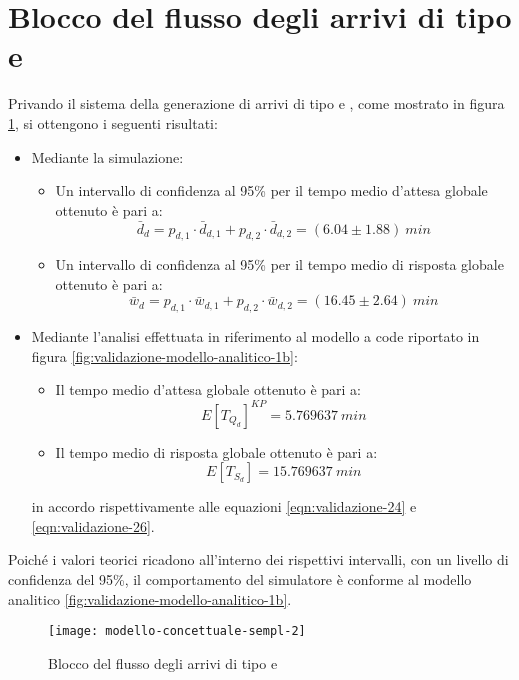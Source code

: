 \section{Blocco del flusso degli arrivi di tipo \uo{} e \pp{}}\label{sec:validazione-blocco-uo-pp}
Privando il sistema della generazione di arrivi di tipo \uo{} e \pp{}, come mostrato in figura \ref{fig:validazione-semplificazione-2}, si ottengono i seguenti risultati:
\begin{itemize}
\item Mediante la simulazione:
\begin{itemize}
\item Un intervallo di confidenza al 95\% per il tempo medio d'attesa globale ottenuto è pari a:
\begin{equation} 
\bar{d}_d = p_{d,1}\cdot \bar{d}_{d,1} + p_{d,2}\cdot \bar{d}_{d,2} = (6.04 \pm 1.88)\ min
\end{equation}
\item Un intervallo di confidenza al 95\% per il tempo medio di risposta globale ottenuto è pari a:
\begin{equation}
\bar{w}_d = p_{d,1}\cdot \bar{w}_{d,1} + p_{d,2}\cdot \bar{w}_{d,2} = (16.45 \pm 2.64)\ min
\end{equation}
\end{itemize}

\item Mediante l'analisi effettuata in riferimento al modello a code riportato in figura \ref{fig:validazione-modello-analitico-1b}:
\begin{itemize}
\item Il tempo medio d'attesa globale ottenuto è pari a:
\begin{equation}
E[T_{Q_d}]^{KP} = 5.769637\ min 
\end{equation}
\item Il tempo medio di risposta globale ottenuto è pari a:
\begin{equation}
E[T_{S_d}] = 15.769637\ min 
\end{equation}
\end{itemize}
in accordo rispettivamente alle equazioni \ref{eqn:validazione-24} e \ref{eqn:validazione-26}.
\end{itemize}

Poiché i valori teorici ricadono all'interno dei rispettivi intervalli, con un livello di confidenza del 95\%, il comportamento del simulatore è conforme al modello analitico \ref{fig:validazione-modello-analitico-1b}.

\begin{figure}[ht]
\centering
\texttt{[image: modello-concettuale-sempl-2]}
\caption{Blocco del flusso degli arrivi di tipo \uo{} e \pp{}}
\label{fig:validazione-semplificazione-2}
\end{figure}
